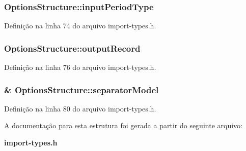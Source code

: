 \subsubsection[{input\+Period\+Type}]{ Options\+Structure\+::input\+Period\+Type}\label{struct_options_structure_a4b257d87cbc2a2ab50db00ead8bee158}


Definição na linha 74 do arquivo import-\/types.\+h.

\subsubsection[{output\+Record}]{ Options\+Structure\+::output\+Record}\label{struct_options_structure_aa5fbabeff2e0b6598b900d28b91c95fa}


Definição na linha 76 do arquivo import-\/types.\+h.

\subsubsection[{separator\+Model}]{\& Options\+Structure\+::separator\+Model}\label{struct_options_structure_a1864bdee336b5645fae1467b450046b1}


Definição na linha 80 do arquivo import-\/types.\+h.



A documentação para esta estrutura foi gerada a partir do seguinte arquivo\+:\begin{DoxyCompactItemize}
\item 
{\bf import-\/types.\+h}\end{DoxyCompactItemize}
